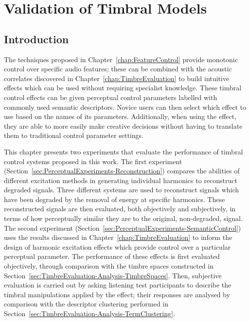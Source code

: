 \chapter{Validation of Timbral Models}
\label{chap:PerceptualExperiments}

\section{Introduction}
\label{sec:PerceptualExperiments-Introduction}
	The techniques proposed in Chapter~\ref{chap:FeatureControl} provide monotonic control over specific audio
	features; these can be combined with the acoustic correlates discovered in Chapter~\ref{chap:TimbreEvaluation} to
	build intuitive effects which can be used without requiring specialist knowledge. These timbral control effects can
	be given perceptual control parameters labelled with commonly used semantic descriptors. Novice users can then
	select which effect to use based on the names of its parameters. Additionally, when using the effect, they are able
	to more easily make creative decisions without having to translate them to traditional control parameter settings.

	This chapter presents two experiments that evaluate the performance of timbral control systems proposed in this
	work. The first experiment (Section~\ref{sec:PerceptualExperiments-Reconstruction}) compares the abilities of
	different excitation methods in generating individual harmonics to reconstruct degraded signals. Three different
	systems are used to reconstruct signals which have been degraded by the removal of energy at specific harmonics.
	These reconstructed signals are then evaluated, both objectively and subjectively, in terms of how perceptually
	similar they are to the original, non-degraded, signal. The second experiment
	(Section~\ref{sec:PerceptualExperiments-SemanticControl}) uses the results discussed in
	Chapter~\ref{chap:TimbreEvaluation} to inform the design of harmonic excitation effects which provide control over
	a particular perceptual parameter. The performance of these effects is first evaluated objectively, through
	comparison with the timbre spaces constructed in Section~\ref{sec:TimbreEvaluation-Analysis-TimbreSpaces}. Then,
	subjective evaluation is carried out by asking listening test participants to describe the timbral manipulations
	applied by the effect; their responses are analysed by comparison with the descriptor clustering performed in
	Section~\ref{sec:TimbreEvaluation-Analysis-TermClustering}.

